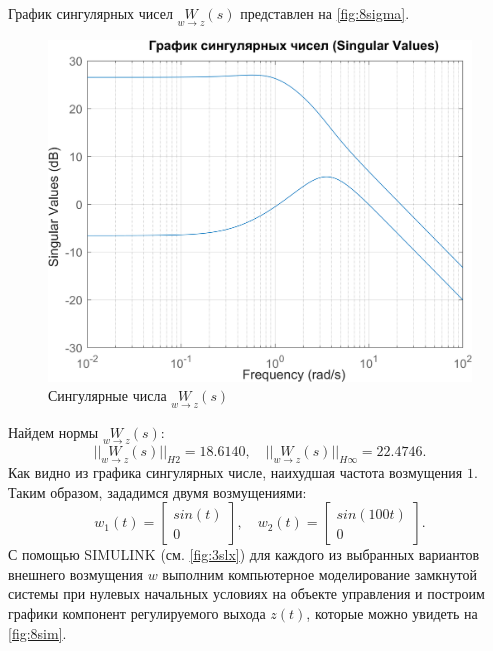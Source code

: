 График сингулярных чисел $\underset{w\rightarrow z}{W}(s)$ представлен на \autoref{fig:8sigma}.
\begin{figure}[H]
    \centering
    \includegraphics[width=0.8\linewidth]{figs/8_sigma.png}
    \caption{Сингулярные числа $\underset{w\rightarrow z}{W}(s)$}
    \label{fig:8sigma}
\end{figure}
\noindent Найдем нормы $\underset{w\rightarrow z}{W}(s)$:
\begin{equation*}
    ||\underset{w\rightarrow z}{W}(s)||_{H2}=18.6140,\quad
    ||\underset{w\rightarrow z}{W}(s)||_{H\infty}=22.4746.
\end{equation*}
Как видно из графика сингулярных числе, наихудшая частота возмущения $1$.
Таким образом, зададимся двумя возмущениями:
\begin{equation*}
    w_1(t)=\begin{bmatrix}
        sin(t)\\
        0
    \end{bmatrix},\quad
    w_2(t)=\begin{bmatrix}
        sin(100t)\\
        0
    \end{bmatrix}.
\end{equation*}
С помощью SIMULINK (см. \autoref{fig:3slx}) для каждого из выбранных вариантов внешнего возмущения $w$ выполним 
компьютерное моделирование замкнутой системы при нулевых начальных условиях
на объекте управления и построим графики компонент регулируемого выхода
$z(t)$, которые можно увидеть на \autoref{fig:8sim}.
